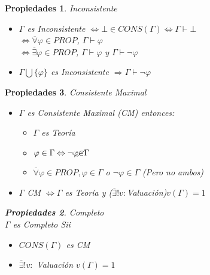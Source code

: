 \documentclass[12pt,a4paper]{article}
\newtheorem*{props}{Propiedades}
\begin{document}
\begin{props}Inconsistente\\

	\begin{itemize}
		\item$\Gamma$ es Inconsistente $\Leftrightarrow \bot \in CONS(\Gamma) \Leftrightarrow \Gamma \vdash \bot$\\
		$\Leftrightarrow \overline{\forall}\varphi \in PROP$, $\Gamma \vdash \varphi$\\
		$\Leftrightarrow \overline{\exists}\varphi \in PROP $, $\Gamma \vdash \varphi$ y $\Gamma \vdash \neg\varphi$
		\item $\Gamma \bigcup \{\varphi\}$ es Inconsistente $\Rightarrow \Gamma \vdash \neg \varphi$		
	\end{itemize}

\end{props}
\begin{props}Consistente Maximal\\

	\begin{itemize}
		\item $\Gamma$ es Consistente Maximal (CM) entonces:
			\begin{itemize}
				\item $\Gamma$ es Teoría
				\item $\varphi \in \Gamma \Leftrightarrow \neg \varphi \cancel{\in} \Gamma$
				\item $\overline{\forall}\varphi \in PROP, \varphi \in \Gamma$ o $\neg\varphi \in \Gamma$ (Pero no ambos)
				
			\end{itemize}
		\item $\Gamma$ CM $\Leftrightarrow \Gamma$ es Teoría y ($\overline{\exists}! v : $Valuación)$v(\Gamma) = 1$
	\end{itemize}
\begin{props}Completo\\
	$\Gamma$ es Completo Sii
	\begin{itemize}
		\item $CONS(\Gamma)$ es CM
		\item $\overline{\exists}! v: $ Valuación $v(\Gamma) = 1$
	\end{itemize}
\end{props}
\end{props}	
\end{document}
